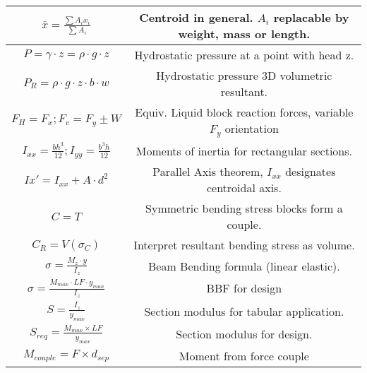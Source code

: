 \documentclass[12pt]{article}
\begin{document}
\begin{table}[h!]
\begin{center}
\begin{tabular}{|c | c |}
            $\bar{x} = \frac{\sum A_i x_i}{\sum A_i}$  & Centroid in general. $A_i$ replacable by weight, mass or length.\\\hline

            $P = \gamma \cdot z = \rho \cdot g \cdot z$ & Hydrostatic pressure at a point with head z. \\\hline

            $P_R = \rho \cdot g \cdot z \cdot b \cdot w$ & Hydrostatic pressure 3D volumetric resultant. \\\hline

            $F_H = F_x ; F_v = F_y \pm W$ & Equiv. Liquid block reaction forces, variable $F_y$ orientation\\\hline
            $I_{xx} = \frac{bh^3}{12}; I_{yy} = \frac{b^3h}{12}$ & Moments of inertia for rectangular sections.\\\hline

            $Ix' = I_{xx} + A\cdot d^2$ & Parallel Axis theorem, $I_{xx}$ designates centroidal axis.\\\hline

            $C = T$ & Symmetric bending stress blocks form a couple.\\\hline

            $C_R = V(\sigma_C)$ & Interpret resultant bending stress as volume.\\\hline

            $\sigma = \frac {M_z \cdot y}{I_z}$& Beam Bending formula (linear elastic).\\\hline

            $\sigma = \frac{M_{max} \cdot LF \cdot y_{max}}{I_z}$ & BBF for design\\\hline

            $S = \frac{I_z}{y_{max}}$ & Section modulus for tabular application.\\\hline

            $S_{req} = \frac{M_{max} \times LF} {y_{max}}$ & Section modulus for design.\\\hline

            $M_{couple} = F \times d_{sep}$ & Moment from force couple\\\hline
            \end{tabular}

        \end {center}
    \end{table}
\end{document}
